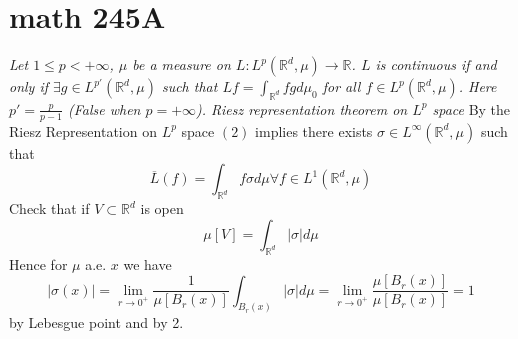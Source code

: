 \documentclass[11pt]{article}
\begin{document}
\section{math 245A}
\emph{
    Let $1 \le p < +\infty$, $\mu$ be a measure on $ L : L^{p}( \mathbb{R}^{d}, \mu) \rightarrow \mathbb{R}$.
    $L$ is continuous if and only if $\exists g \in L^{p'} ( \mathbb{R}^{d}, \mu) $ such that $Lf = \int_{ \mathbb{R}^{d}}^{}fg d \mu_{0}$ for all $f \in L^{p}( \mathbb{R}^{d}, \mu)$.
    Here $p' = \frac{p}{p-1}$ (False when $p = +\infty$). Riesz representation theorem on $ L^{p}$ space 
}
By the Riesz Representation on $L^{p}$ space $(2)$ implies there exists  $\sigma \in L^{\infty}( \mathbb{R}^{d}, \mu)$ such that
\[
\overline{L}(f) = \int_{ \mathbb{R}^{d}}^{}f \sigma d \mu \forall f \in L^{1} ( \mathbb{R}^{d}, \mu)
\] 
Check that if $V \subset \mathbb{R}^{d}$ is open
\[
    \mu[V] = \int_{ \mathbb{R}^{d}}^{} |\sigma| d \mu
\] 
Hence for $\mu$ a.e. $x$ we have
\[
    |\sigma(x)| = \lim_{r\to 0^{+}} \frac{1}{\mu[B_r(x)]}\int_{B_r(x)}^{}|\sigma| d \mu = \lim_{r\to 0^{+}}\frac{\mu[B_r(x)]}{\mu[B_r(x)]} = 1
\] 
by Lebesgue point and by 2.
\end{document}

